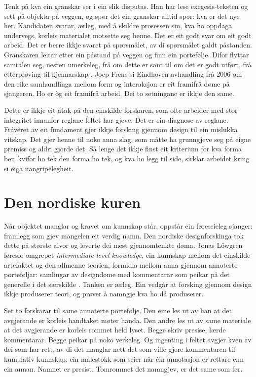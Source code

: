 Tenk på kva ein granskar ser i ein slik disputas. Han har lese exegesis-teksten og sett på objekta på veggen, og spør det ein granskar alltid spør: kva er det nye her. Kandidaten svarar, ærleg, med å skildre prosessen sin, kva ho oppdaga undervegs, korleis materialet motsette seg henne. Det er eit godt svar om eit godt arbeid. Det er berre ikkje svaret på spørsmålet, av di spørsmålet galdt påstanden. Granskaren leitar etter ein påstand på veggen og finn ein portefølje. Difor flyttar samtalen seg, nesten umerkeleg, frå om dette er sant til om det er godt utført, frå etterprøving til kjennarskap \autocite{nilsson2012doctorateness}. Joep Frens si Eindhoven-avhandling frå 2006 om den rike samhandlinga mellom form og interaksjon \autocite{frens2006rich} er eit framifrå døme på sjangeren. Ho er òg eit framifrå arbeid. Dei to setningane er ikkje den same.

Dette er ikkje eit åtak på den einskilde forskaren, som ofte arbeider med stor integritet innanfor reglane feltet har gjeve. Det er ein diagnose av reglane. Fråvêret av eit fundament gjer ikkje forsking gjennom design til ein mislukka vitskap. Det gjer henne til noko anna slag, som måtte ha grunngjeve seg på eigne premiss og aldri gjorde det. Så lenge det ikkje finst eit kriterium for kva forma ber, kvifor ho tek den forma ho tek, og kva ho legg til side, sirklar arbeidet kring si eiga uangripelegheit.

\section{Den nordiske kuren}

Når objektet manglar og kravet om kunnskap står, oppstår ein føreseieleg sjanger: framlegg som gjev mangelen eit verdig namn. Den nordiske designforskinga tok dette på største alvor og leverte dei mest gjennomtenkte døma. Jonas Löwgren føreslo omgrepet \emph{intermediate-level knowledge}, ein kunnskap mellom det einskilde artefaktet og den allmenne teorien, formidla mellom anna gjennom annoterte porteføljar: samlingar av designdøme med kommentarar som peikar på det generelle i det særskilde \autocite{lowgren2013intermediate}. Tanken er ærleg. Ein vedgår at forsking gjennom design ikkje produserer teori, og prøver å namngje kva ho då produserer.

Set to forskarar til same annoterte portefølje. Den eine les ut av han at det avgjerande er korleis handtaket møter handa. Den andre les ut av same materiale at det avgjerande er korleis rommet held lyset. Begge skriv presise, lærde kommentarar. Begge peikar på noko verkeleg. Og ingenting i feltet avgjer kven av dei som har rett, av di det manglar nett det som ville gjere kommentaren til kumulativ kunnskap: ein målestokk som seier når éin annotasjon er rettare enn ein annan. Namnet er presist. Tomrommet det namngjev, er det same som før.

